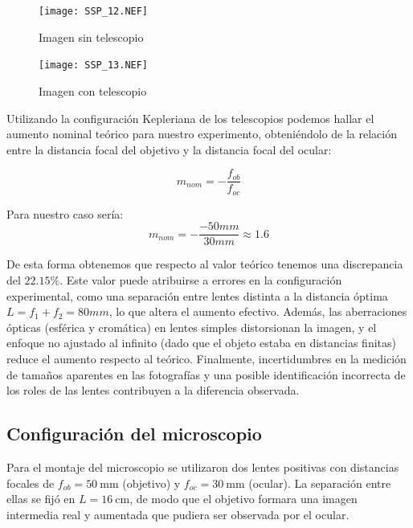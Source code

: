 \documentclass[5p,letterpaper]{article}
\begin{document}
\begin{figure}[H]
    \begin{minipage}{0.48\textwidth} %
        \centering
        \texttt{[image: SSP\_12.NEF]}
        \caption{Imagen sin telescopio}
        \label{fig:imagen1}
    \end{minipage}
    \hfill %
    \begin{minipage}{0.48\textwidth} %
        \centering
        \texttt{[image: SSP\_13.NEF]}
        \caption{Imagen con telescopio}
        \label{fig:imagen2}
    \end{minipage}
\end{figure}

Utilizando la configuración Kepleriana de los telescopios podemos hallar el aumento nominal teórico para nuestro experimento, obteniéndolo de la relación entre la distancia focal del objetivo y la distancia focal del ocular:

\begin{equation}
    m_{nom}= -\frac{f_{ob}}{f_{oc}}
\end{equation}

Para nuestro caso sería:
\begin{equation}
    m_{nom}=-\frac{-50mm}{30mm} \approx 1.6
\end{equation}

De esta forma obtenemos que respecto al valor teórico tenemos una discrepancia del $22.15\%$. Este valor puede atribuirse a errores en la configuración experimental, como una separación entre lentes distinta a la distancia óptima $L =f_1 +f_2=80 mm$, lo que altera el aumento efectivo. Además, las aberraciones ópticas (esférica y cromática) en lentes simples distorsionan la imagen, y el enfoque no ajustado al infinito (dado que el objeto estaba en distancias finitas) reduce el aumento respecto al teórico. Finalmente, incertidumbres en la medición de tamaños aparentes en las fotografías y una posible identificación incorrecta de los roles de las lentes contribuyen a la diferencia observada.

\subsection{Configuración del microscopio}

Para el montaje del microscopio se utilizaron dos lentes positivas con distancias focales de $f_{ob}=50 \ \text{mm}$ (objetivo) y $f_{oc}=30 \ \text{mm}$ (ocular). La separación entre ellas se fijó en $L=16 \ \text{cm}$, de modo que el objetivo formara una imagen intermedia real y aumentada que pudiera ser observada por el ocular.
\end{document}
